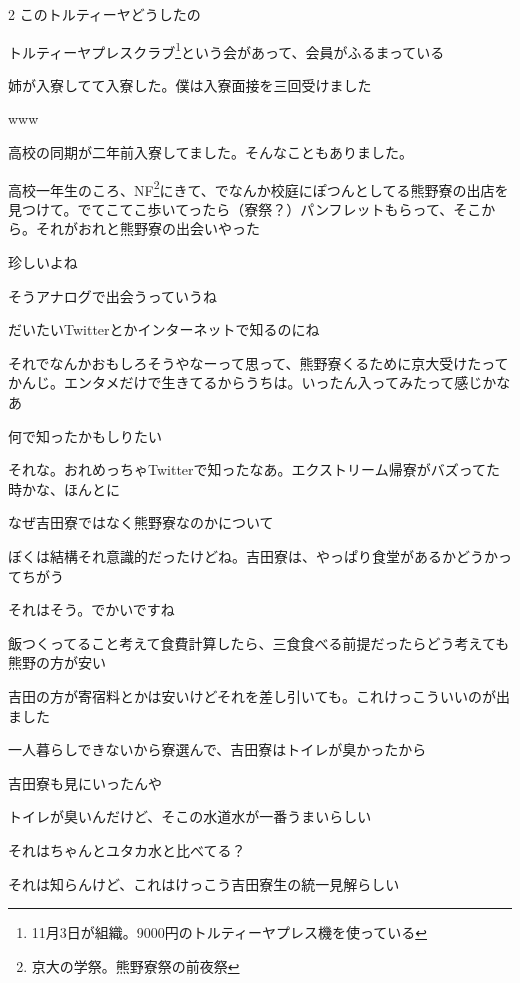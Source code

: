 \begin{multicols}{2}
 このトルティーヤどうしたの

 トルティーヤプレスクラブ\footnote{11月3日が組織。9000円のトルティーヤプレス機を使っている}という会があって、会員がふるまっている

 姉が入寮してて入寮した。僕は入寮面接を三回受けました

 www

 高校の同期が二年前入寮してました。そんなこともありました。

 高校一年生のころ、NF\footnote{京大の学祭。熊野寮祭の前夜祭}にきて、でなんか校庭にぽつんとしてる熊野寮の出店を見つけて。でてこてこ歩いてったら（寮祭？）パンフレットもらって、そこから。それがおれと熊野寮の出会いやった

 珍しいよね

 そうアナログで出会うっていうね

 だいたいTwitterとかインターネットで知るのにね

 それでなんかおもしろそうやなーって思って、熊野寮くるために京大受けたってかんじ。エンタメだけで生きてるからうちは。いったん入ってみたって感じかなあ

 何で知ったかもしりたい

 それな。おれめっちゃTwitterで知ったなあ。エクストリーム帰寮がバズってた時かな、ほんとに

 なぜ吉田寮ではなく熊野寮なのかについて

 ぼくは結構それ意識的だったけどね。吉田寮は、やっぱり食堂があるかどうかってちがう

 それはそう。でかいですね

 飯つくってること考えて食費計算したら、三食食べる前提だったらどう考えても熊野の方が安い

 吉田の方が寄宿料とかは安いけどそれを差し引いても。これけっこういいのが出ました

 一人暮らしできないから寮選んで、吉田寮はトイレが臭かったから

 吉田寮も見にいったんや

 トイレが臭いんだけど、そこの水道水が一番うまいらしい

 それはちゃんとユタカ水と比べてる？

 それは知らんけど、これはけっこう吉田寮生の統一見解らしい


\end{multicols}
